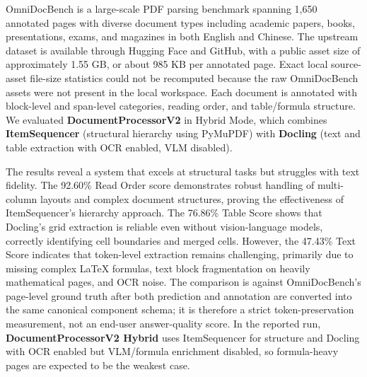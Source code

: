 OmniDocBench is a large-scale PDF parsing benchmark spanning 1,650 annotated pages with diverse document types including academic papers, books, presentations, exams, and magazines in both English and Chinese. The upstream dataset is available through Hugging Face and GitHub, with a public asset size of approximately 1.55 GB, or about 985 KB per annotated page. Exact local source-asset file-size statistics could not be recomputed because the raw OmniDocBench assets were not present in the local workspace. Each document is annotated with block-level and span-level categories, reading order, and table/formula structure. We evaluated \textbf{DocumentProcessorV2} in Hybrid Mode, which combines \textbf{ItemSequencer} (structural hierarchy using PyMuPDF) with \textbf{Docling} (text and table extraction with OCR enabled, VLM disabled).

\begin{table}[H]
    \centering
    \caption{OmniDocBench Parsing Evaluation (1650 Pages, DocumentProcessorV2 Hybrid).}
    \label{tab:omnidocbench_results}
\end{table}

The results reveal a system that excels at structural tasks but struggles with text fidelity. The 92.60\% Read Order score demonstrates robust handling of multi-column layouts and complex document structures, proving the effectiveness of ItemSequencer's hierarchy approach. The 76.86\% Table Score shows that Docling's grid extraction is reliable even without vision-language models, correctly identifying cell boundaries and merged cells. However, the 47.43\% Text Score indicates that token-level extraction remains challenging, primarily due to missing complex LaTeX formulas, text block fragmentation on heavily mathematical pages, and OCR noise. The comparison is against OmniDocBench's page-level ground truth after both prediction and annotation are converted into the same canonical component schema; it is therefore a strict token-preservation measurement, not an end-user answer-quality score. In the reported run, \textbf{DocumentProcessorV2 Hybrid} uses ItemSequencer for structure and Docling with OCR enabled but VLM/formula enrichment disabled, so formula-heavy pages are expected to be the weakest case.

